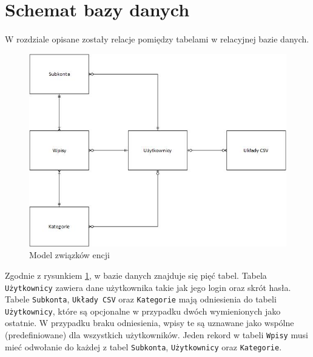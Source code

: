 \documentclass{article}
\begin{document}
	\section{Schemat bazy danych}
	\paragraph{} W rozdziale opisane zostały relacje pomiędzy tabelami w relacyjnej bazie danych. 
	\begin{figure}[H]
		\centering
		\includegraphics[width=0.8\linewidth]{assets/er.jpg}
		\caption[]{Model związków encji}
		\label{fig:er}
	\end{figure}
	
	Zgodnie z rysunkiem \ref{fig:er}, w bazie danych znajduje się pięć tabel. Tabela \texttt{Użytkownicy} zawiera dane użytkownika takie jak jego login oraz skrót hasła. Tabele \texttt{Subkonta}, \texttt{Układy CSV} oraz \texttt{Kategorie} mają odniesienia do tabeli \texttt{Użytkownicy}, które są opcjonalne w przypadku dwóch wymienionych jako ostatnie. W przypadku braku odniesienia, wpisy te są uznawane jako wspólne (predefiniowane) dla wszystkich użytkowników. Jeden rekord w tabeli \texttt{Wpisy} musi mieć odwołanie do każdej z tabel \texttt{Subkonta}, \texttt{Użytkownicy} oraz \texttt{Kategorie}.
	
	
\end{document}

